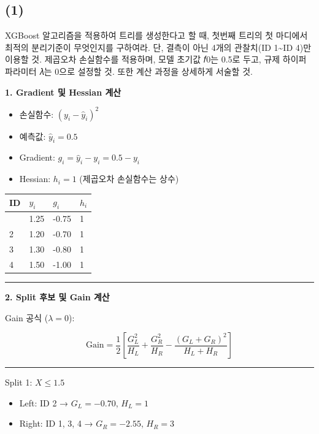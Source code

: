 \documentclass[
  a4paper,
  DIV=11,
  numbers=noendperiod]{scrreprt}
\providecommand{\tightlist}{%
  \setlength{\itemsep}{0pt}\setlength{\parskip}{0pt}}\usepackage{longtable,booktabs,array}
\begin{document}
\subsection{(1)}\label{section-8}

XGBoost 알고리즘을 적용하여 트리를 생성한다고 할 때, 첫번째 트리의 첫
마디에서 최적의 분리기준이 무엇인지를 구하여라. 단, 결측이 아닌 4개의
관찰치(ID 1\textasciitilde ID 4)만 이용할 것. 제곱오차 손실함수를
적용하며, 모델 초기값 𝑓0는 0.5로 두고, 규제 하이퍼 파라미터 𝜆는 0으로
설정할 것. 또한 계산 과정을 상세하게 서술할 것.

\textbf{1. Gradient 및 Hessian 계산}

\begin{itemize}
\tightlist
\item
  손실함수: \((y_i - \hat{y}_i)^2\)
\item
  예측값: \(\hat{y}_i = 0.5\)
\item
  Gradient: \(g_i = \hat{y}_i - y_i = 0.5 - y_i\)
\item
  Hessian: \(h_i = 1\) (제곱오차 손실함수는 상수)
\end{itemize}

\begin{longtable}[]{@{}llll@{}}
\toprule\noalign{}
ID & \(y_i\) & \(g_i\) & \(h_i\) \\
\midrule\noalign{}
\endhead
\bottomrule\noalign{}
\endlastfoot
1 & 1.25 & -0.75 & 1 \\
2 & 1.20 & -0.70 & 1 \\
3 & 1.30 & -0.80 & 1 \\
4 & 1.50 & -1.00 & 1 \\
\end{longtable}

\begin{center}\rule{0.5\linewidth}{0.5pt}\end{center}

\textbf{2. Split 후보 및 Gain 계산}

Gain 공식 (\(\lambda = 0\)):

\[
\text{Gain} = \frac{1}{2} \left[ \frac{G_L^2}{H_L} + \frac{G_R^2}{H_R} - \frac{(G_L + G_R)^2}{H_L + H_R} \right]
\]

\begin{center}\rule{0.5\linewidth}{0.5pt}\end{center}

Split 1: \(X \leq 1.5\)

\begin{itemize}
\tightlist
\item
  Left: ID 2 → \(G_L = -0.70\), \(H_L = 1\)\\
\item
  Right: ID 1, 3, 4 → \(G_R = -2.55\), \(H_R = 3\)
\end{itemize}
\end{document}
